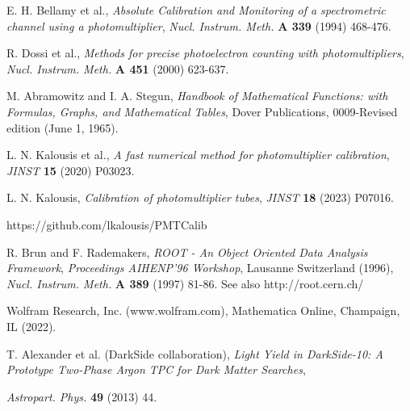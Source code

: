 \documentclass[preprint,12pt]{elsarticle}
\begin{document}
\begin{thebibliography}{00}


 E. H. Bellamy {et al.}, \emph{Absolute Calibration and Monitoring of a spectrometric channel using a photomultiplier}, 
\emph{Nucl. Instrum. Meth.} {\bf A 339} (1994) 468-476. 

  R. Dossi {et al.}, \emph{Methods for precise photoelectron counting with photomultipliers}, 
\emph{Nucl. Instrum. Meth.} {\bf A 451} (2000) 623-637.

 M. Abramowitz and I. A. Stegun, \emph{Handbook of Mathematical Functions: with Formulas, Graphs, and Mathematical Tables}, Dover Publications, 0009-Revised edition (June 1, 1965).  

 L. N. Kalousis {et al.}, \emph{A fast numerical method for photomultiplier calibration}, \emph{JINST} {\bf 15} (2020) P03023.

 L. N. Kalousis, \emph{Calibration of photomultiplier tubes}, \emph{JINST} {\bf 18} (2023) P07016.

 https://github.com/lkalousis/PMTCalib

 R. Brun and F. Rademakers, \emph{ROOT - An Object Oriented Data Analysis Framework}, \emph{Proceedings AIHENP'96 Workshop}, Lausanne Switzerland (1996),
{\emph{Nucl. Instrum. Meth.} {\bf A 389 } (1997) 81-86.} See also http://root.cern.ch/

 Wolfram Research, Inc. (www.wolfram.com), Mathematica Online, Champaign, IL (2022).

 T. Alexander {et al.} (DarkSide collaboration), \emph{Light Yield in DarkSide-10: A Prototype Two-Phase Argon TPC for Dark Matter Searches}, 

\emph{Astropart. Phys.} {\bf 49} (2013) 44.

\end{thebibliography}
\end{document}
